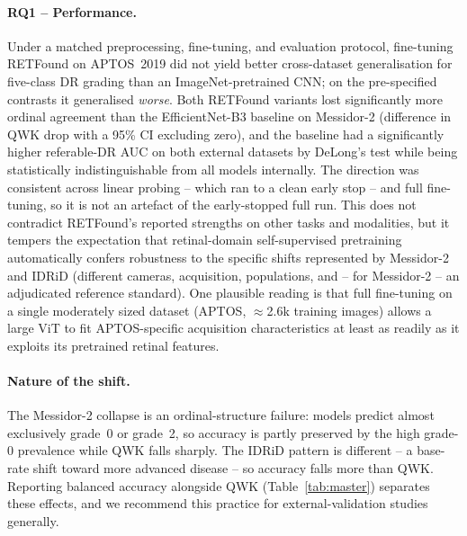 \documentclass[11pt,a4paper]{article}
\begin{document}
\paragraph{RQ1 -- Performance.} Under a matched preprocessing, fine-tuning, and
evaluation protocol, fine-tuning RETFound on APTOS~2019 did not yield better
cross-dataset generalisation for five-class DR grading than an
ImageNet-pretrained CNN; on the pre-specified contrasts it generalised
\emph{worse}. Both RETFound variants lost significantly more ordinal agreement
than the EfficientNet-B3 baseline on Messidor-2 (difference in QWK drop with a
95\% CI excluding zero), and the baseline had a significantly higher referable-DR
AUC on both external datasets by DeLong's test while being statistically
indistinguishable from all models internally. The direction was consistent
across linear probing -- which ran to a clean early stop -- and full fine-tuning,
so it is not an artefact of the early-stopped full run. This does not contradict
RETFound's reported strengths on other tasks and modalities, but it tempers the
expectation that retinal-domain self-supervised pretraining automatically confers
robustness to the specific shifts represented by Messidor-2 and IDRiD (different
cameras, acquisition, populations, and -- for Messidor-2 -- an adjudicated
reference standard). One plausible reading is that full fine-tuning on a
single moderately sized dataset (APTOS, $\approx$2.6k training images) allows a
large ViT to fit APTOS-specific acquisition characteristics at least as readily
as it exploits its pretrained retinal features.

\paragraph{Nature of the shift.} The Messidor-2 collapse is an ordinal-structure
failure: models predict almost exclusively grade~0 or grade~2, so accuracy is
partly preserved by the high grade-0 prevalence while QWK falls sharply. The
IDRiD pattern is different -- a base-rate shift toward more advanced disease --
so accuracy falls more than QWK. Reporting balanced accuracy alongside QWK
(Table~\ref{tab:master}) separates these effects, and we recommend this practice
for external-validation studies generally.
\end{document}
